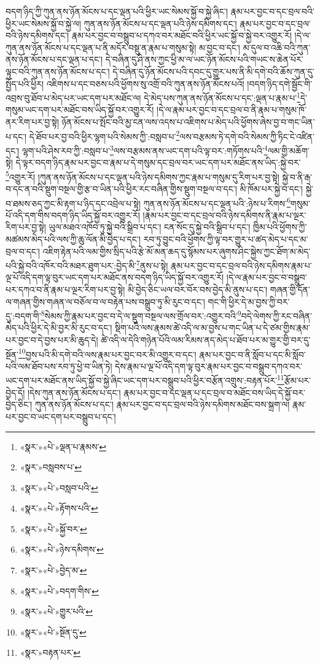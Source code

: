 བདག་ཉིད་ཀྱི་ཀུན་ནས་ཉོན་མོངས་པ་དང་ལྡན་པའི་ཕྱིར་ཡང་སེམས་སྐྱོ་བ་སྐྱེ་ཞིང་། རྣམ་པར་བྱང་བ་དང་བྲལ་བའི་ཕྱིར་ཡང་སེམས་སྐྱོ་བ་སྐྱེ་ལ། ཀུན་ནས་ཉོན་མོངས་པ་དང་ལྡན་པའི་ཉེས་དམིགས་དང་། རྣམ་པར་བྱང་བ་དང་བྲལ་བའི་ཉེས་དམིགས་དང་། རྣམ་པར་བྱང་བ་བསྒྲུབ་པ་དཀའ་བར་མཐོང་བའི་ཕྱིར་ཡང་སྐྱོ་བ་སྐྱེ་བར་འགྱུར་རོ། །དེ་ལ་ཀུན་ནས་ཉོན་མོངས་པ་དང་ལྡན་པ་ནི་མདོར་བསྡུ་ན་རྣམ་པ་གསུམ་སྟེ། མ་བྱང་བ་དང་། མ་དུལ་བ་འཆི་བའི་ཀུན་ནས་ཉོན་མོངས་པ་དང་ལྡན་པ་དང་། དེ་བཞིན་དུ་ཤི་ནས་ཀྱང་ཕྱི་མ་ལ་ཡང་ཉོན་མོངས་པའི་གཡང་ས་ཆེན་པོར་ལྟུང་བའི་ཀུན་ནས་ཉོན་མོངས་པ་དང་། དེ་བཞིན་དུ་ཉོན་མོངས་པའི་དབང་དུ་གྱུར་པས་ནི་མི་དགེ་བའི་ཆོས་ཀུན་དུ་སྤྱོད་པའི་ཕྱིར། འཇིགས་པ་དང་བཅས་པའི་ཕྱོགས་སུ་འགྲོ་བའི་ཀུན་ནས་ཉོན་མོངས་པའོ། །བདག་ཉིད་དགེ་སྦྱོང་གི་འབྲས་བུ་ཐོབ་པ་མེད་པར་ཡང་དག་པར་མཐོང་ལ། དེ་མེད་པས་ཀུན་ནས་ཉོན་མོངས་པ་དང་:ལྡན་པ་རྣམ་པ་\footnote{«སྣར་»«པེ་»ལྡན་པ་རྣམས་}དེ་གསུམ་ཡང་དག་པར་མཐོང་བས་ཡིད་སྐྱོ་བར་འགྱུར་རོ། །དེ་ལ་རྣམ་པར་བྱང་བ་དང་བྲལ་བ་ནི་རྣམ་པ་གསུམ་ཁོ་ནར་རིག་པར་བྱ་སྟེ། ཉོན་མོངས་པ་སྤོང་བའི་མྱ་ངན་ལས་འདས་པ་འཇིགས་པ་མེད་པའི་ཕྱོགས་ཞེས་བྱ་བ་གང་ཡིན་པ་དང་། དེ་ཐོབ་པར་བྱ་བའི་ཕྱིར་ལྷག་པའི་སེམས་ཀྱི་:བསླབ་པ་\footnote{«སྣར་»བསླབས་པ་}ལས་བརྩམས་ཏེ་དགེ་བའི་སེམས་ཀྱི་ཏིང་ངེ་འཛིན་དང་། ལྷག་པའི་ཤེས་རབ་ཀྱི་:བསླབ་པ་\footnote{«སྣར་»«པེ་»བསླབ་པའི་}ལས་བརྩམས་ནས་ཡང་དག་པའི་ལྟ་བར་:གཏོགས་པའི་\footnote{«སྣར་»«པེ་»རྟོགས་པའི་}ལམ་གྱི་མཆོག་སྟེ། དེ་ལྟར་བདག་ཉིད་རྣམ་པར་བྱང་བ་རྣམ་པ་དེ་གསུམ་དང་བྲལ་བར་ཡང་དག་པར་མཐོང་ནས་ཡིད་:སྐྱེ་བར་\footnote{«སྣར་»«པེ་»སྐྱོ་བར་}འགྱུར་རོ། །ཀུན་ནས་ཉོན་མོངས་པ་དང་ལྡན་པའི་ཉེས་དམིགས་ཀྱང་རྣམ་པ་གསུམ་དུ་རིག་པར་བྱ་སྟེ། སྐྱེ་བ་ནི་རྒ་བ་དང་ན་བའི་སྡུག་བསྔལ་གྱི་རྩ་བ་ཡིན་པའི་ཕྱིར་རང་བཞིན་གྱིས་སྡུག་བསྔལ་བ་དང་། མི་ཁོམ་པར་སྐྱེ་བ་དང་། སྐྱེ་བ་ཐམས་ཅད་ཀྱང་མི་རྟག་པ་ཉིད་དང་འབྲེལ་པ་སྟེ། ཀུན་ནས་ཉོན་མོངས་པ་དང་ལྡན་པའི་:ཉེས་པ་རིགས་\footnote{«སྣར་»«པེ་»ཉེས་དམིགས་}གསུམ་པོ་འདི་དག་གིས་བདག་ཉིད་ཡིད་སྐྱོ་བར་འགྱུར་རོ། །རྣམ་པར་བྱང་བ་དང་བྲལ་བའི་ཉེས་དམིགས་ནི་རྣམ་པ་ལྔར་རིག་པར་བྱ་སྟེ། ཡུལ་མཐའ་འཁོབ་ཏུ་སྐྱེ་བའི་སྒྲིབ་པ་དང་། ངན་སོང་དུ་སྐྱེ་བའི་སྒྲིབ་པ་དང་། ཁྱིམ་པའི་ཕྱོགས་ཀྱི་མཚམས་མེད་པའི་ལས་ཀྱི་ཆུ་ལོན་མི་བྱེད་པ་དང་། རབ་ཏུ་བྱུང་བའི་ཕྱོགས་ཀྱི་ལྟ་བར་གྱུར་པ་ཚད་མེད་པ་དང་མ་བྲལ་བ་དང་། འཇིག་རྟེན་པའི་ལམ་གྱིས་སྲིད་པའི་རྩེ་མོ་མན་ཆད་དུ་སྙོམས་པར་ཞུགས་ཤིང་སྐྱེས་ཀྱང་ཐོག་མ་མེད་པའི་སྐྱེ་བའི་འཁོར་བའི་མཐར་ཐུག་པར་:བྱེད་མི་\footnote{«སྣར་»«པེ་»བྱེད་མ་}ནུས་པ་སྟེ། རྣམ་པར་བྱང་བ་དང་བྲལ་བའི་ཉེས་དམིགས་རྣམ་པ་ལྔ་པོ་འདི་དག་ལྟ་བུར་ཡང་དག་པར་མཐོང་ནས་བདག་ཉིད་ཡིད་སྐྱོ་བར་འགྱུར་རོ། །དེ་ལ་རྣམ་པར་བྱང་བ་བསྒྲུབ་པར་དཀའ་བ་ནི་རྣམ་པ་ལྔར་རིག་པར་བྱ་སྟེ། མི་བྱེད་ཅིང་ཡལ་བར་བོར་བས་བྱེད་མི་ནུས་པ་དང་། གཞན་གྱི་དོན་ལ་གཞན་གྱིས་གཞན་ལ་བཅོལ་བ་ལ་བརྟེན་པས་བསྒྲུབ་ཏུ་མི་རུང་བ་དང་། གང་གི་ཕྱིར་དེ་མ་བྱས་ཀྱི་བར་དུ་:བདག་གི་\footnote{«སྣར་»«པེ་»བདག་གིས་}སེམས་ཀྱི་རྣམ་པར་བྱང་བ་དེ་ལ་སྡུག་བསྔལ་ལས་གྲོལ་བར་:འགྱུར་བའི་\footnote{«སྣར་»«པེ་»གྱུར་པའི་}བདེ་ལེགས་ཀྱི་རང་བཞིན་མེད་པའི་ཕྱིར་དེ་མི་བྱར་མི་རུང་བ་དང་། སྡིག་པའི་ལས་རྣམས་ཚེ་འདི་ལ་མ་བྱས་པ་གང་ཡིན་པ་དེ་ཙམ་གྱིས་རྣམ་པར་བྱང་བ་དེ་བྱས་པར་མི་ཆུད་དེ། ཚེ་འདི་ལ་དེའི་གཉེན་པོའི་ལམ་རིམས་ནད་མེད་པ་ཐོབ་པར་མ་གྱུར་གྱི་བར་དུ་སྔོན་\footnote{«སྣར་»«པེ་»སྔོན་དུ་}བྱས་པའི་མི་དགེ་བའི་ལས་རྣམ་པར་བྱང་བར་མི་འགྱུར་བ་དང་། རྣམ་པར་བྱང་བ་ནི་སློབ་པ་དང་མི་སློབ་པའི་ལམ་ཐོབ་པས་རབ་ཏུ་ཕྱེ་བ་ཡིན་ཏེ། དེས་རྣམ་པ་ལྔ་པོ་འདི་དག་ལྟ་བུར་རྣམ་པར་བྱང་བ་བསྒྲུབ་དཀའ་བར་ཡང་དག་པར་མཐོང་ནས་ཡིད་སྐྱོ་བ་སྐྱེ་ཞིང་ཡང་དག་པར་བསྒྲུབ་པའི་ཕྱིར་བརྩོན་འགྲུས་:བརྟན་པོར་\footnote{«སྣར་»བརྟན་པར་}རྩོམ་པར་བྱེད་དོ། །དེས་ཀུན་ནས་ཉོན་མོངས་པ་དང་། རྣམ་པར་བྱང་བ་དང་ལྡན་པ་དང་བྲལ་བ་མཐོང་བས་ཡིད་དེ་སྐྱོ་བར་བྱེད་ཅིང་། ཀུན་ནས་ཉོན་མོངས་པ་དང་། རྣམ་པར་བྱང་བ་དང་བྲལ་བའི་ཉེས་དམིགས་མཐོང་བས་སྐྲག་ལ། རྣམ་པར་བྱང་བ་ཡང་དག་པར་བསྒྲུབ་པ་དང་། 